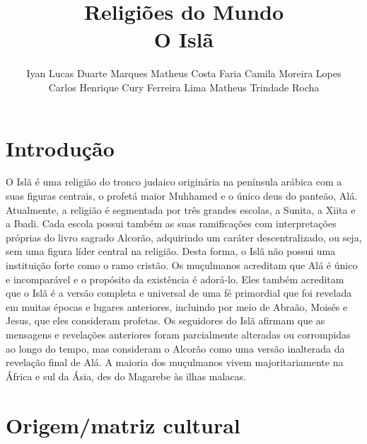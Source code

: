 \documentclass[12pt]{article}
\title{Religiões do Mundo\\O Islã}
\author{Iyan Lucas Duarte Marques\inst{1}
Matheus Costa Faria\inst{1}
Camila Moreira Lopes\inst{1}\\
Carlos Henrique Cury Ferreira Lima\inst{1}
Matheus Trindade Rocha\inst{1}}
\begin{document}
\maketitle
\section{Introdução}
O Islã é uma religião do tronco judaico originária na península arábica com a suas figuras centrais, o profetá maior Muhhamed e o único deus do panteão, Alá.
Atualmente, a religião é segmentada por três grandes escolas, a Sunita, a Xiita e a Ibadi. 
Cada escola possui também as suas ramificações com interpretações próprias do livro sagrado Alcorão, adquirindo um caráter descentralizado, ou seja, sem uma figura líder central na religião.
Desta forma, o Islã não possui uma instituição forte como o ramo cristão.
Os muçulmanos acreditam que Alá é único e incomparável e o propósito da existência é adorá-lo.
Eles também acreditam que o Islã é a versão completa e universal de uma fé primordial que foi revelada em muitas épocas e lugares anteriores, incluindo por meio de Abraão, Moisés e Jesus, que eles consideram profetas.
Os seguidores do Islã afirmam que as mensagens e revelações anteriores foram parcialmente alteradas ou corrompidas ao longo do tempo, mas consideram o Alcorão como uma versão inalterada da revelação final de Alá.
A maioria dos muçulmanos vivem majoritariamente na África e sul da Ásia, des do Magarebe às ilhas malacas.
\section{Origem/matriz cultural}
\end{document}
